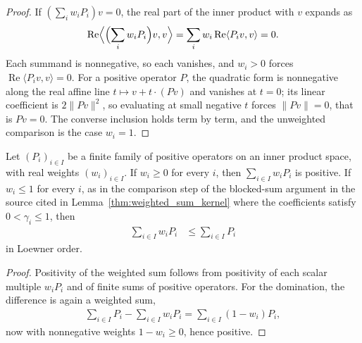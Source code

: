 \begin{proof}
    \leanok
    If $(\sum_iw_iP_i)v=0$, the real part of the inner product with $v$
    expands as
    \begin{align}
        \operatorname{Re}\Bigl\langle\Bigl(\sum_iw_iP_i\Bigr)v,v\Bigr\rangle
        =\sum_iw_i\operatorname{Re}\langle P_iv,v\rangle
        =0.
    \end{align}
    Each summand is nonnegative, so each vanishes, and $w_i>0$ forces
    $\operatorname{Re}\langle P_iv,v\rangle=0$.  For a positive operator
    $P$, the quadratic form is nonnegative along the real affine line
    $t\mapsto v+t\cdot(Pv)$ and vanishes at $t=0$; its linear coefficient
    is $2\lVert Pv\rVert^2$, so evaluating at small negative $t$ forces
    $\lVert Pv\rVert=0$, that is $Pv=0$.  The converse inclusion holds
    term by term, and the unweighted comparison is the case $w_i=1$.
\end{proof}

\begin{lemma}
    \label{thm:weighted_sum_loewner}
    \leanok
    Let $(P_i)_{i\in I}$ be a finite family of positive operators on an
    inner product space, with real weights $(w_i)_{i\in I}$.  If
    $w_i\geq0$ for every $i$, then $\sum_{i\in I}w_iP_i$ is positive.  If
    $w_i\leq1$ for every $i$, as in the comparison step of the blocked-sum
    argument in the source cited in Lemma~\ref{thm:weighted_sum_kernel}
    where the coefficients satisfy $0<\gamma_i\leq1$, then
    \begin{align}
        \sum_{i\in I}w_iP_i
         & \leq\sum_{i\in I}P_i
    \end{align}
    in Loewner order.
\end{lemma}

\begin{proof}
    \leanok
    Positivity of the weighted sum follows from positivity of each scalar
    multiple $w_iP_i$ and of finite sums of positive operators.  For the
    domination, the difference is again a weighted sum,
    \begin{align}
        \sum_{i\in I}P_i-\sum_{i\in I}w_iP_i
        =\sum_{i\in I}(1-w_i)P_i,
    \end{align}
    now with nonnegative weights $1-w_i\geq0$, hence positive.
\end{proof}

